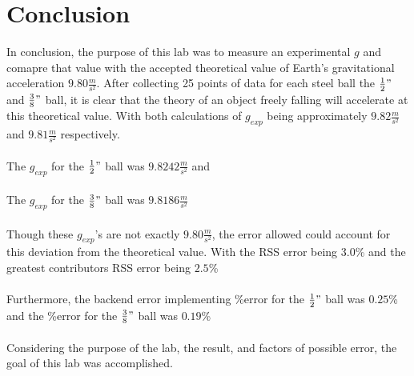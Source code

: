 \chapter{Conclusion}

In conclusion, the purpose of this lab was to measure an experimental $g$ and comapre
that value with the accepted theoretical value of Earth's gravitational acceleration
$9.80\frac{m}{s^2}$. After collecting 25 points of data for each steel ball the 
$\frac{1}{2}"$ and $\frac{3}{8}"$ ball, it is clear that the theory of an object freely falling
will accelerate at this theoretical value. With both calculations of $g_{exp}$ being approximately
$9.82\frac{m}{s^2}$ and $9.81\frac{m}{s^2}$ respectively. \\\\
The $g_{exp}$ for the $\frac{1}{2}"$ ball was $9.8242\frac{m}{s^2}$ and\\\\
The $g_{exp}$ for the $\frac{3}{8}"$ ball was $9.8186\frac{m}{s^2}$\\\\
Though these $g_{exp}$'s are not exactly $9.80\frac{m}{s^2}$, the error allowed 
could account for this deviation from the theoretical value. With the RSS error being 
$3.0$\% and the greatest contributors RSS error being $2.5$\%\\\\
Furthermore, the backend error implementing \%error for the $\frac{1}{2}"$ ball was
$0.25$\% and the \%error for the $\frac{3}{8}"$ ball was $0.19$\%\\\\
Considering the purpose of the lab, the result, and factors of possible error, 
the goal of this lab was accomplished.
